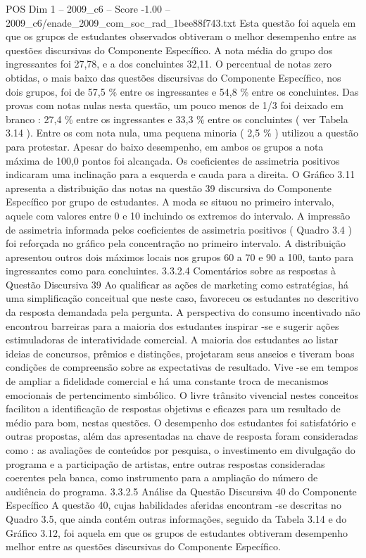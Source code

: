 \begin{textsample}{POS Dim 1 – 2009\_c6 – Score -1.00 – 2009\_c6/enade\_2009\_com\_soc\_rad\_1bee88f743.txt}
Esta questão foi aquela em que os grupos de estudantes observados obtiveram o melhor desempenho entre as questões discursivas do Componente Específico.
A nota média do grupo dos ingressantes foi 27,78, e a dos concluintes 32,11.
O percentual de notas zero obtidas, o mais baixo das questões discursivas do Componente Específico, nos dois grupos, foi de 57,5 \% entre os ingressantes e 54,8 \% entre os concluintes.
Das provas com notas nulas nesta questão, um pouco menos de 1/3 foi deixado em branco : 27,4 \% entre os ingressantes e 33,3 \% entre os concluintes ( ver Tabela 3.14 ).
Entre os com nota nula, uma pequena minoria ( 2,5 \% ) utilizou a questão para protestar.
Apesar do baixo desempenho, em ambos os grupos a nota máxima de 100,0 pontos foi alcançada.
Os coeficientes de assimetria positivos indicaram uma inclinação para a esquerda e cauda para a direita.
O Gráfico 3.11 apresenta a distribuição das notas na questão 39 discursiva do Componente Específico por grupo de estudantes.
A moda se situou no primeiro intervalo, aquele com valores entre 0 e 10 incluindo os extremos do intervalo.
A impressão de assimetria informada pelos coeficientes de assimetria positivos ( Quadro 3.4 ) foi reforçada no gráfico pela concentração no primeiro intervalo.
A distribuição apresentou outros dois máximos locais nos grupos 60 a 70 e 90 a 100, tanto para ingressantes como para concluintes. 3.3.2.4 Comentários sobre as respostas à Questão Discursiva 39 Ao qualificar as ações de marketing como estratégias, há uma simplificação conceitual que neste caso, favoreceu os estudantes no descritivo da resposta demandada pela pergunta.
A perspectiva do consumo incentivado não encontrou barreiras para a maioria dos estudantes inspirar -se e sugerir ações estimuladoras de interatividade comercial.
A maioria dos estudantes ao listar ideias de concursos, prêmios e distinções, projetaram seus anseios e tiveram boas condições de compreensão sobre as expectativas de resultado.
Vive -se em tempos de ampliar a fidelidade comercial e há uma constante troca de mecanismos emocionais de pertencimento simbólico.
O livre trânsito vivencial nestes conceitos facilitou a identificação de respostas objetivas e eficazes para um resultado de médio para bom, nestas questões.
O desempenho dos estudantes foi satisfatório e outras propostas, além das apresentadas na chave de resposta foram consideradas como : as avaliações de conteúdos por pesquisa, o investimento em divulgação do programa e a participação de artistas, entre outras respostas consideradas coerentes pela banca, como instrumento para a ampliação do número de audiência do programa. 3.3.2.5 Análise da Questão Discursiva 40 do Componente Específico A questão 40, cujas habilidades aferidas encontram -se descritas no Quadro 3.5, que ainda contém outras informações, seguido da Tabela 3.14 e do Gráfico 3.12, foi aquela em que os grupos de estudantes obtiveram desempenho melhor entre as questões discursivas do Componente Específico.

\end{textsample}
